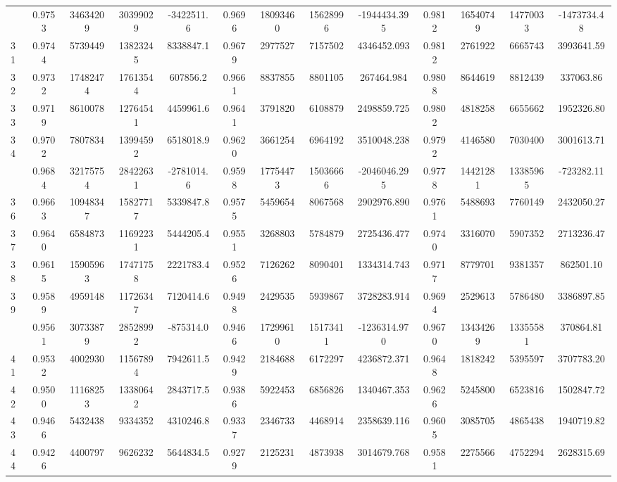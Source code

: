 \documentclass[
  12pt,
]{article}
\begin{document}
\begin{longtable}[t]{lcccccccccccc}
\addlinespace
30 & 0.9753 & 34634209 & 30399029 & -3422511.6 & 0.9696 & 18093460 & 15628996 & -1944434.395 & 0.9812 & 16540749 & 14770033 & -1473734.48\\
31 & 0.9744 & 5739449 & 13823245 & 8338847.1 & 0.9679 & 2977527 & 7157502 & 4346452.093 & 0.9812 & 2761922 & 6665743 & 3993641.59\\
32 & 0.9732 & 17482474 & 17613544 & 607856.2 & 0.9661 & 8837855 & 8801105 & 267464.984 & 0.9808 & 8644619 & 8812439 & 337063.86\\
33 & 0.9719 & 8610078 & 12764541 & 4459961.6 & 0.9641 & 3791820 & 6108879 & 2498859.725 & 0.9802 & 4818258 & 6655662 & 1952326.80\\
34 & 0.9702 & 7807834 & 13994592 & 6518018.9 & 0.9620 & 3661254 & 6964192 & 3510048.238 & 0.9792 & 4146580 & 7030400 & 3001613.71\\
\addlinespace
35 & 0.9684 & 32175754 & 28422631 & -2781014.6 & 0.9598 & 17754473 & 15036666 & -2046046.295 & 0.9778 & 14421281 & 13385965 & -723282.11\\
36 & 0.9663 & 10948347 & 15827717 & 5339847.8 & 0.9575 & 5459654 & 8067568 & 2902976.890 & 0.9761 & 5488693 & 7760149 & 2432050.27\\
37 & 0.9640 & 6584873 & 11692231 & 5444205.4 & 0.9551 & 3268803 & 5784879 & 2725436.477 & 0.9740 & 3316070 & 5907352 & 2713236.47\\
38 & 0.9615 & 15905963 & 17471758 & 2221783.4 & 0.9526 & 7126262 & 8090401 & 1334314.743 & 0.9717 & 8779701 & 9381357 & 862501.10\\
39 & 0.9589 & 4959148 & 11726347 & 7120414.6 & 0.9498 & 2429535 & 5939867 & 3728283.914 & 0.9694 & 2529613 & 5786480 & 3386897.85\\
\addlinespace
40 & 0.9561 & 30733879 & 28528992 & -875314.0 & 0.9466 & 17299610 & 15173411 & -1236314.970 & 0.9670 & 13434269 & 13355581 & 370864.81\\
41 & 0.9532 & 4002930 & 11567894 & 7942611.5 & 0.9429 & 2184688 & 6172297 & 4236872.371 & 0.9648 & 1818242 & 5395597 & 3707783.20\\
42 & 0.9500 & 11168253 & 13380642 & 2843717.5 & 0.9386 & 5922453 & 6856826 & 1340467.353 & 0.9626 & 5245800 & 6523816 & 1502847.72\\
43 & 0.9466 & 5432438 & 9334352 & 4310246.8 & 0.9337 & 2346733 & 4468914 & 2358639.116 & 0.9605 & 3085705 & 4865438 & 1940719.82\\
44 & 0.9426 & 4400797 & 9626232 & 5644834.5 & 0.9279 & 2125231 & 4873938 & 3014679.768 & 0.9581 & 2275566 & 4752294 & 2628315.69\\

\end{longtable}
\end{document}
